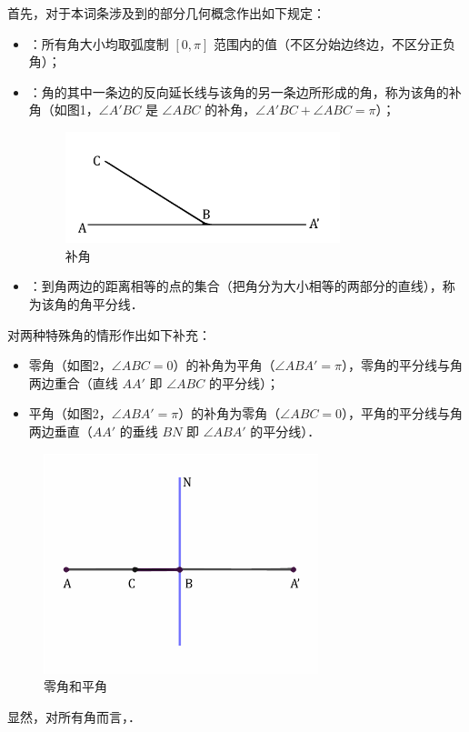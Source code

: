 

首先，对于本词条涉及到的部分几何概念作出如下规定：
\begin{itemize}
\item {}：所有角大小均取弧度制 $[0,\pi]$ 范围内的值（不区分始边终边，不区分正负角）；
\item {}：角的其中一条边的反向延长线与该角的另一条边所形成的角，称为该角的补角（如图1，$\angle A'BC$ 是 $\angle ABC$ 的补角，$\angle A'BC + \angle ABC = \pi$）；
\begin{figure}[ht]
\centering
\includegraphics[width=8cm]{./figures/ConOpt1.pdf}
\caption{补角} \label{ConOpt_fig1}
\end{figure}
\item {}：到角两边的距离相等的点的集合（把角分为大小相等的两部分的直线），称为该角的角平分线．
\end{itemize}
对两种特殊角的情形作出如下补充：
\begin{itemize}
\item 零角（如图2，$\angle ABC = 0$）的补角为平角（$\angle ABA' = \pi$），零角的平分线与角两边重合（直线 $AA'$ 即 $\angle ABC$ 的平分线）；
\item 平角（如图2，$\angle ABA' = \pi$）的补角为零角（$\angle ABC = 0$），平角的平分线与角两边垂直（$AA'$ 的垂线 $BN$ 即 $\angle ABA'$ 的平分线）．
\end{itemize}
\begin{figure}[ht]
\centering
\includegraphics[width=8cm]{./figures/ConOpt2.pdf}
\caption{零角和平角} \label{ConOpt_fig2}
\end{figure}
显然，对所有角而言，．


